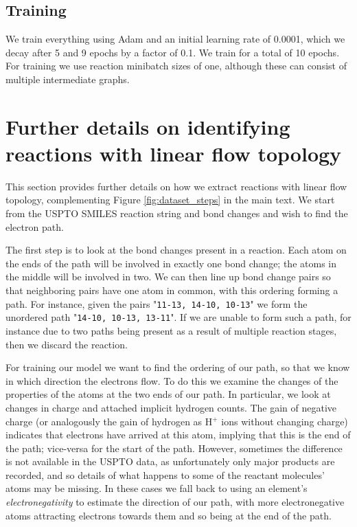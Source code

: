 \subsection{Training}

We train everything using Adam \citep{kingma2014adam} and an initial learning rate of 0.0001, which we decay after 5 and 9 epochs by a factor of 0.1. 
We train for a total of 10 epochs.
For training we use reaction minibatch sizes of one, although these can consist of multiple intermediate graphs.






\section{Further details on identifying reactions with linear flow topology}
\label{sect:electron_path_identify}

This section provides further details on how we extract reactions with linear flow topology, complementing Figure \ref{fig:dataset_steps} in the main text. 
We start from the USPTO SMILES reaction string and bond changes and wish to find the electron path.

The first step is to look at the bond changes present in a reaction. 
Each atom on the ends of the path will be involved in exactly one bond change;
the atoms in the middle will be involved in two. 
We can then line up bond change pairs so that neighboring pairs have one atom in common,
 with this ordering forming a path.
For instance, given the pairs "\texttt{11-13, 14-10, 10-13}" we form the unordered path "\texttt{14-10, 10-13, 13-11}".
If we are unable to form such a path, for instance due to two paths being present as a result of multiple reaction stages, then we discard the reaction.

For training our model we want to find the ordering of our path, so that we know in which direction the electrons flow.
To do this we examine the changes of the properties of the atoms at the two ends of our path. 
In particular, we look at changes in charge and attached implicit hydrogen counts. 
The gain of negative charge (or analogously the gain of hydrogen as H$^+$ ions without changing charge) indicates that electrons have arrived at this atom, 
implying that this is the end of the path; 
vice-versa for the start of the path.
However, sometimes the difference is not available in the USPTO data, as unfortunately only major products are recorded, and so details of what happens to some of the reactant molecules' atoms may be missing.
In these cases we fall back to using an element's {\em electronegativity} to estimate the direction of our path, with more electronegative atoms attracting electrons towards them and so being at the end of the path. 

